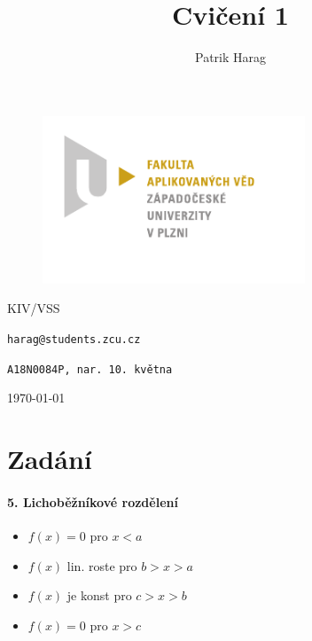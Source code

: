 \documentclass[12pt, a4paper]{article}
\title{Cvičení 1}
\author{Patrik Harag}
\makeatletter
\def \thesubtitle {KIV/VSS}
\def \theauthoremail {harag@students.zcu.cz}
\def \theauthorid {A18N0084P, nar. 10. května}
\makeatother
\begin{document}
\begin{titlepage}
	\begin{figure}
		\includegraphics[height=50mm]{img-fav-logo}
	\end{figure}
	
	\centering
	{\large \hspace{1mm} \par} %
	\vspace{15ex}
	
	{\huge\bfseries \thetitle \par}
	\vspace{2ex}
	{\scshape\Large \thesubtitle \par}
	\vspace{15ex}
	{\Large\itshape \theauthor \par}
	\vspace{2ex}
	{\texttt{\theauthoremail} \par}
	\vspace{1ex}
	{\texttt{\theauthorid} \par}
	
	\vfill

	{\today\par}
\end{titlepage}

\section{Zadání}

\paragraph{5. Lichoběžníkové rozdělení}
\begin{itemize}
	\item $f(x) = 0$ pro $x < a$
	\item $f(x)$ lin. roste pro $b > x > a$
	\item $f(x)$ je konst pro $c > x > b$
	\item $f(x) = 0$ pro $x > c$
\end{itemize}
\end{document}
